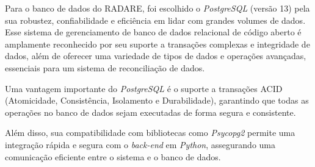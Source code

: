 Para o banco de dados do RADARE, foi escolhido o \textit{PostgreSQL} (versão 13) pela sua robustez, confiabilidade e eficiência em lidar com grandes volumes de dados. Esse sistema de gerenciamento de banco de dados relacional de código aberto é amplamente reconhecido por seu suporte a transações complexas e integridade de dados, além de oferecer uma variedade de tipos de dados e operações avançadas, essenciais para um sistema de reconciliação de dados.

Uma vantagem importante do \textit{PostgreSQL} é o suporte a transações ACID (Atomicidade, Consistência, Isolamento e Durabilidade), garantindo que todas as operações no banco de dados sejam executadas de forma segura e consistente.

Além disso, sua compatibilidade com bibliotecas como \textit{Psycopg2} permite uma integração rápida e segura com o \textit{back-end} em \textit{Python}, assegurando uma comunicação eficiente entre o sistema e o banco de dados.
